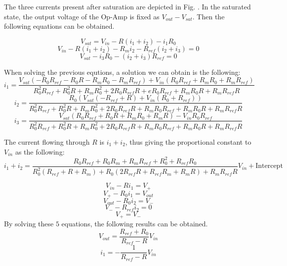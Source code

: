 \documentclass[%
 aip,
amsmath,amssymb,
reprint,
]{revtex4-1}
\begin{document}
The three currents present after saturation are depicted in Fig. . In the saturated state, the output voltage of the Op-Amp is fixed as $V_{out}-V_{sat}$. Then the following equations can be obtained.


\begin{equation}
  V_{sat} = V_{in}-R(i_1+i_2)-i_1R_0
\end{equation}
\begin{equation}
  V_{in} - R(i_1+i_2)-R_mi_2-R_{ref}(i_2+i_3) = 0
\end{equation}
\begin{equation}
  V_{sat} -i_3R_0-(i_2+i_3)R_{ref} = 0
\end{equation}

When solving the previous equtions, a solution we can obtain is the following:
\begin{equation}
  i_1 = \frac{V_{sat}(-R_0R_{ref}-R_0R-R_mR_0-R_mR_{ref})+V_{in}(R_0R_{ref}+R_mR_0+R_mR_{ref})}{R_0^2R_{ref}+R_0^2R+R_mR_0^2+2R_0R_{ref}R+eR_0R_{ref}+R_mR_0R+R_mR_{ref}R}
\end{equation}
\begin{equation}
  i_2 = \frac{R_0(V_{sat}(-R_{ref}+R)+V_{in}(R_0+R_{ref}))}{R_0^2R_{ref}+R_0^2R+R_mR_0^2+2R_0R_{ref}R+R_mR_0R_{ref}+R_mR_0R+R_mR_{ref}R}
\end{equation}
\begin{equation}
  i_3 = \frac{V_{sat}(R_0R_{ref}+R_0R+R_mR_0+R_mR)-V_{in}R_0R_{ref}}{R_0^2R_{ref}+R_0^2R+R_mR_0^2+2R_0R_{ref}R+R_mR_0R_{ref}+R_mR_0R+R_mR_{ref}R}
\end{equation}

The current flowing through $R$ is $i_1+i_2$, thus giving the proportional constant to $V_{in}$ as the following:
\begin{equation}
  i_1+i_2 = \frac{R_0R_{ref}+R_0R_m+R_mR_{ref}+R_0^2+R_{ref}R_0}{R_0^2(R_{ref}+R+R_m)+R_0(2R_{ref}R+R_{ref}R_m+R_mR)+R_mR_{ref}R}V_{in} + \text{Intercept}
\end{equation}

\begin{equation}
  V_{in}-Ri_1 = V_+
\end{equation}
\begin{equation}
  V_+ -R_0i_1 = V_{out}
\end{equation}
\begin{equation}
  V_{out}-R_0i_2=V_-
\end{equation}
\begin{equation}
  V_--R_{ref}i_2=0
\end{equation}
\begin{equation}
  V_+ = V_-
\end{equation}
By solving these $5$ equations, the following results can be obtained.
\begin{equation}
  V_{out} = \frac{R_{ref}+R_0}{R_{ref}-R}V_{in}
\end{equation}
\begin{equation}
  i_1 = -\frac{1}{R_{ref}-R}V_{in}
\end{equation}
\end{document}
